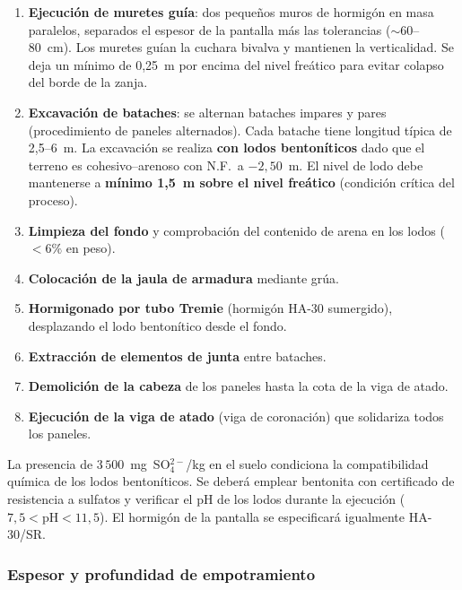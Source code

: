 \begin{enumerate}
  \item \textbf{Ejecución de muretes guía}: dos pequeños muros de hormigón
        en masa paralelos, separados el espesor de la pantalla más las
        tolerancias ($\sim$60--80~cm). Los muretes guían la cuchara bivalva
        y mantienen la verticalidad. Se deja un mínimo de 0{,}25~m por
        encima del nivel freático para evitar colapso del borde de la zanja.
  \item \textbf{Excavación de bataches}: se alternan bataches impares y pares
        (procedimiento de paneles alternados). Cada batache tiene longitud
        típica de 2{,}5--6~m. La excavación se realiza \textbf{con lodos
        bentoníticos} dado que el terreno es cohesivo--arenoso con N.F.\ a
        $-2{,}50$~m. El nivel de lodo debe mantenerse a \textbf{mínimo
        1{,}5~m sobre el nivel freático} (condición crítica del proceso).
  \item \textbf{Limpieza del fondo} y comprobación del contenido de arena
        en los lodos ($<\!6\%$ en peso).
  \item \textbf{Colocación de la jaula de armadura} mediante grúa.
  \item \textbf{Hormigonado por tubo Tremie} (hormigón HA-30 sumergido),
        desplazando el lodo bentonítico desde el fondo.
  \item \textbf{Extracción de elementos de junta} entre bataches.
  \item \textbf{Demolición de la cabeza} de los paneles hasta la cota de
        la viga de atado.
  \item \textbf{Ejecución de la viga de atado} (viga de coronación) que
        solidariza todos los paneles.
\end{enumerate}

\begin{notabox}
  La presencia de $3\,500$~mg~SO$_4^{2-}$/kg en el suelo condiciona la
  compatibilidad química de los lodos bentoníticos. Se deberá emplear
  bentonita con certificado de resistencia a sulfatos y verificar el
  pH de los lodos durante la ejecución ($7{,}5 < \text{pH} < 11{,}5$).
  El hormigón de la pantalla se especificará igualmente HA-30/SR.
\end{notabox}

\subsubsection{Espesor y profundidad de empotramiento}
\label{subsubsec:empotramiento}


